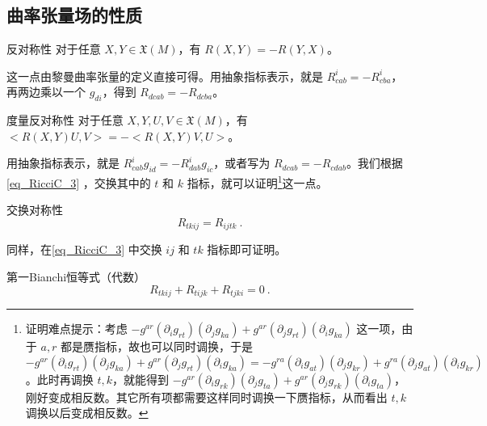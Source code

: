 








\subsection{曲率张量场的性质}

\begin{theorem}{反对称性}
对于任意 $X, Y\in\mathfrak{X}(M)$，有 $R(X, Y)=-R(Y, X)$。
\end{theorem}


这一点由黎曼曲率张量的定义直接可得。用抽象指标表示，就是 $R^i_{cab}=-R^i_{cba}$，再两边乘以一个 $g_{di}$，得到 $R_{dcab}=-R_{dcba}$。





\begin{theorem}{度量反对称性}
对于任意 $X, Y, U, V\in\mathfrak{X}(M)$，有 $<R(X, Y)U, V>=-<R(X, Y)V, U>$。


\end{theorem}

用抽象指标表示，就是 $R^i_{cab}g_{id}=-R^i_{dab}g_{ic}$，或者写为 $R_{dcab}=-R_{cdab}$。我们根据\autoref{eq_RicciC_3}  ，交换其中的 $t$ 和 $k$ 指标，就可以证明\footnote{证明难点提示：考虑 $-g^{ar}(\partial_ig_{rt})(\partial_jg_{ka})+g^{ar}(\partial_jg_{rt})(\partial_ig_{ka})$ 这一项，由于 $a, r$ 都是赝指标，故也可以同时调换，于是 $-g^{ar}(\partial_ig_{rt})(\partial_jg_{ka})+g^{ar}(\partial_jg_{rt})(\partial_ig_{ka})=-g^{ra}(\partial_ig_{at})(\partial_jg_{kr})+g^{ra}(\partial_jg_{at})(\partial_ig_{kr})$。此时再调换 $t, k$，就能得到 $-g^{ar}(\partial_ig_{rk})(\partial_jg_{ta})+g^{ar}(\partial_jg_{rk})(\partial_ig_{ta})$，刚好变成相反数。其它所有项都需要这样同时调换一下赝指标，从而看出 $t, k$ 调换以后变成相反数。}这一点。

\begin{theorem}{交换对称性}\label{the_RicciC_2}
\begin{equation}\label{eq_RicciC_5}
R_{tkij}=R_{ijtk}~.
\end{equation}
\end{theorem}

同样，在\autoref{eq_RicciC_3} 中交换 $ij$ 和 $tk$ 指标即可证明。

\begin{theorem}{第一Bianchi恒等式（代数）}
\begin{equation}\label{eq_RicciC_4}
R_{tkij}+R_{tijk}+R_{tjki}=0~.
\end{equation}
\end{theorem}

